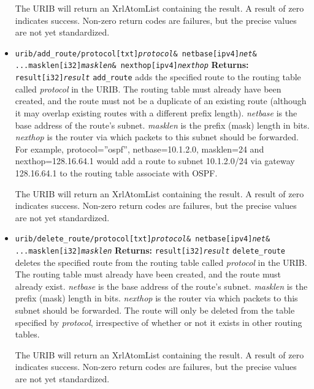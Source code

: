 \documentclass[11pt]{article}
\begin{document}
\begin{itemize}
The URIB will return an XrlAtomList containing the result.  A result
of zero indicates success.  Non-zero return codes are failures, but
the precise values are not yet standardized.

\item 
{\tt urib/add\_route/protocol[txt]{\it protocol}\& netbase[ipv4]{\it net}\&
\newline
...\hspace{0.25in}masklen[i32]{\it masklen}\& nexthop[ipv4]{\it nexthop}}
\newline
{\bf Returns:} {\tt result[i32]{\it result}}
\newline
{\tt add\_route} adds the specified route to the routing table called {\it
protocol} in the URIB.  The routing table must already have been
created, and the route must not be a duplicate of an existing route
(although it may overlap existing routes with a different prefix
length).  {\it netbase} is the base address of the route's subnet.
{\it masklen} is the prefix (mask) length in bits.  {\it nexthop} is
the router via which packets to this subnet should be forwarded.  For
example, protocol=''ospf'', netbase=10.1.2.0, masklen=24 and
nexthop=128.16.64.1 would add a route to subnet 10.1.2.0/24 via
gateway 128.16.64.1 to the routing table associate with OSPF.

The URIB will return an XrlAtomList containing the result.  A result
of zero indicates success.  Non-zero return codes are failures, but
the precise values are not yet standardized.

\item 
{\tt urib/delete\_route/protocol[txt]{\it protocol}\& netbase[ipv4]{\it net}\&
\newline
...\hspace{0.25in}masklen[i32]{\it masklen}}
\newline
{\bf Returns:} {\tt result[i32]{\it result}}
\newline
{\tt delete\_route} deletes the specified route from the routing table
called {\it protocol} in the URIB.  The routing table must already
have been created, and the route must already exist.  {\it netbase} is
the base address of the route's subnet.  {\it masklen} is the prefix
(mask) length in bits.  {\it nexthop} is the router via which packets
to this subnet should be forwarded.  The route will only be deleted
from the table specified by {\it protocol}, irrespective of whether or
not it exists in other routing tables.

The URIB will return an XrlAtomList containing the result.  A result
of zero indicates success.  Non-zero return codes are failures, but
the precise values are not yet standardized.


\end{itemize}
\end{document}
